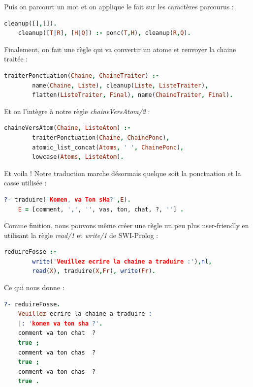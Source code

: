 \documentclass[11pt]{report}
\begin{document}
	Puis on parcourt un mot et on applique le fait sur les caractères parcourus :
	\begin{lstlisting}[language=Prolog]
	cleanup([],[]).
	cleanup([T|R], [H|Q]) :- ponc(T,H), cleanup(R,Q).
	\end{lstlisting}
	
	Finalement, on fait une règle qui va convertir un atome et renvoyer la chaine traitée :
	\begin{lstlisting}[language=Prolog]
	traiterPonctuation(Chaine, ChaineTraiter) :-
		name(Chaine, Liste), cleanup(Liste, ListeTraiter),
		flatten(ListeTraiter, Final), name(ChaineTraiter, Final).
	\end{lstlisting}
	
	Et on l'intègre à notre règle {\em chaineVersAtom/2} :
	\begin{lstlisting}[language=Prolog]
	chaineVersAtom(Chaine, ListeAtom) :-
		traiterPonctuation(Chaine, ChainePonc),
		atomic_list_concat(Atoms, ' ', ChainePonc),
		lowcase(Atoms, ListeAtom).
	\end{lstlisting}
	
	Et voila ! Notre traduction marche désormais quelque soit la ponctuation et la casse utilisée :
	\begin{lstlisting}[language=Prolog]
	?- traduire('Komen, va Ton sHa?',E).
	E = [comment, ',', '', vas, ton, chat, ?, ''] .
	\end{lstlisting}
	
	Comme finition, nous pouvons même créer une règle un peu plus user-friendly en utilisant la règle {\em read/1} et {\em write/1} de SWI-Prolog :
	\begin{lstlisting}[language=Prolog]
	reduireFosse :-
		write('Veuillez ecrire la chaine a traduire :'),nl,
		read(X), traduire(X,Fr), write(Fr).
	\end{lstlisting}
	
	Ce qui nous donne :
	\begin{lstlisting}[language=Prolog]
	?- reduireFosse.
	Veuillez ecrire la chaine a traduire :
	|: 'komen va ton sha ?'.
	comment va ton chat  ?  
	true ;
	comment va ton chas  ?  
	true ;
	comment va ton chas  ?  
	true .
	\end{lstlisting}
	
\end{document}
